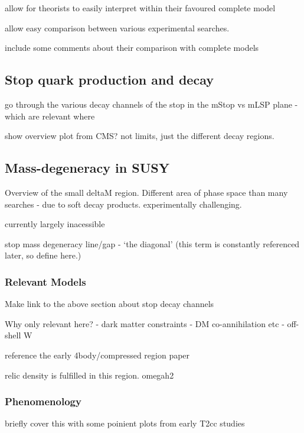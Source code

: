 allow for theorists to easily interpret within their favoured complete model

allow easy comparison between various experimental searches.

include some comments about their comparison with complete models


\subsection{Stop quark production and decay}
go through the various decay channels of the stop in the mStop vs mLSP plane
- which are relevant where

show overview plot from CMS? not limits, just the different decay regions.

\subsection{Mass-degeneracy in SUSY}
Overview of the small deltaM region. Different area of phase space than many
searches - due to soft decay products. experimentally challenging.

currently largely inacessible

stop mass degeneracy line/gap - `the diagonal' (this term is constantly
referenced later, so define here.)

\subsubsection{Relevant Models}
Make link to the above section about stop decay channels

Why only relevant here?
- dark matter constraints - DM co-annihilation etc
- off-shell W

reference the early 4body/compressed region paper

relic density is fulfilled in this region. omegah2

\subsubsection{Phenomenology}
briefly cover this with some poinient plots from early T2cc studies

